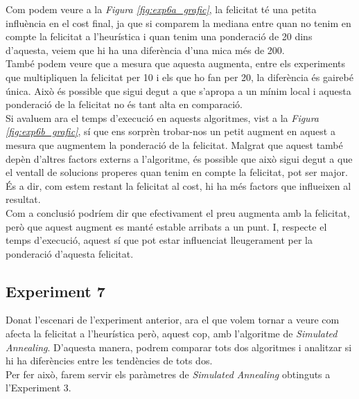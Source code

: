 \documentclass[a4paper]{article}
\begin{document}
	Com podem veure a la \textit{Figura \ref{fig:exp6a_grafic}}, la felicitat té una petita influència en el cost final, ja que si comparem la mediana entre quan no tenim en compte la felicitat a l'heurística i quan tenim una ponderació de 20 dins d'aquesta, veiem que hi ha una diferència d'una mica més de 200. \\
	
	També podem veure que a mesura que aquesta augmenta, entre els experiments que multipliquen la felicitat per 10 i els que ho fan per 20, la diferència és gairebé única. Això és possible que sigui degut a que s'apropa a un mínim local i aquesta ponderació de la felicitat no és tant alta en comparació. \\
	
	Si avaluem ara el temps d'execució en aquests algoritmes, vist a la \textit{Figura \ref{fig:exp6b_grafic}}, sí que ens sorprèn trobar-nos un petit augment en aquest a mesura que augmentem la ponderació de la felicitat. Malgrat que aquest també depèn d'altres factors externs a l'algoritme, és possible que això sigui degut a que el ventall de solucions properes quan tenim en compte la felicitat, pot ser major. És a dir, com estem restant la felicitat al cost, hi ha més factors que influeixen al resultat. \\
	
	Com a conclusió podríem dir que efectivament el preu augmenta amb la felicitat, però que aquest augment es manté estable arribats a un punt. I, respecte el temps d'execució, aquest sí que pot estar influenciat lleugerament per la ponderació d'aquesta felicitat. \\
	
	
	\subsection{Experiment 7}
	
	Donat l'escenari de l'experiment anterior, ara el que volem tornar a veure com afecta la felicitat a l'heurística però, aquest cop, amb l'algoritme de \textit{Simulated Annealing}. D'aquesta manera, podrem comparar tots dos algoritmes i analitzar si hi ha diferències entre les tendències de tots dos. \\
	
	Per fer això, farem servir els paràmetres de \textit{Simulated Annealing} obtinguts a l'Experiment 3. \\
	
\end{document}
